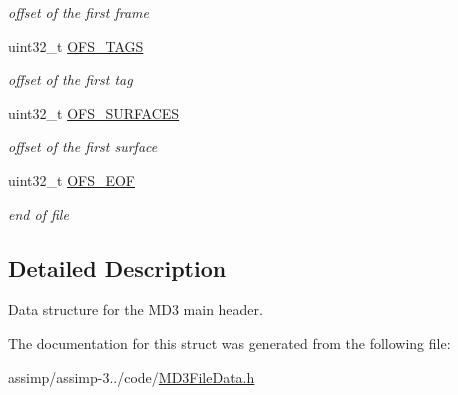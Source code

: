 \begin{DoxyCompactItemize}
\begin{DoxyCompactList}\small\item\em offset of the first frame \end{DoxyCompactList}\item 
\hypertarget{struct_assimp_1_1_m_d3_1_1_header_aa4b3167b066794b1fad64e0598415d1b}{uint32\+\_\+t \hyperlink{struct_assimp_1_1_m_d3_1_1_header_aa4b3167b066794b1fad64e0598415d1b}{O\+F\+S\+\_\+\+T\+A\+G\+S}}\label{struct_assimp_1_1_m_d3_1_1_header_aa4b3167b066794b1fad64e0598415d1b}

\begin{DoxyCompactList}\small\item\em offset of the first tag \end{DoxyCompactList}\item 
\hypertarget{struct_assimp_1_1_m_d3_1_1_header_a18722222ae1b2c726ccf5d75a3f315c8}{uint32\+\_\+t \hyperlink{struct_assimp_1_1_m_d3_1_1_header_a18722222ae1b2c726ccf5d75a3f315c8}{O\+F\+S\+\_\+\+S\+U\+R\+F\+A\+C\+E\+S}}\label{struct_assimp_1_1_m_d3_1_1_header_a18722222ae1b2c726ccf5d75a3f315c8}

\begin{DoxyCompactList}\small\item\em offset of the first surface \end{DoxyCompactList}\item 
\hypertarget{struct_assimp_1_1_m_d3_1_1_header_aea9a23e7a0d2d1e6063a9d9858d881b3}{uint32\+\_\+t \hyperlink{struct_assimp_1_1_m_d3_1_1_header_aea9a23e7a0d2d1e6063a9d9858d881b3}{O\+F\+S\+\_\+\+E\+O\+F}}\label{struct_assimp_1_1_m_d3_1_1_header_aea9a23e7a0d2d1e6063a9d9858d881b3}

\begin{DoxyCompactList}\small\item\em end of file \end{DoxyCompactList}\end{DoxyCompactItemize}


\subsection{Detailed Description}
Data structure for the M\+D3 main header. 

The documentation for this struct was generated from the following file\+:\begin{DoxyCompactItemize}
\item 
assimp/assimp-\/3../code/\hyperlink{_m_d3_file_data_8h}{M\+D3\+File\+Data.\+h}\end{DoxyCompactItemize}

